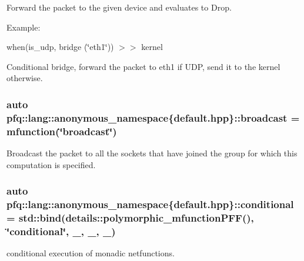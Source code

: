 Forward the packet to the given device and evaluates to {\ttfamily Drop}. 

Example\+:

when(is\+\_\+udp, bridge (\char`\"{}eth1\char`\"{})) $>$$>$ kernel

Conditional bridge, forward the packet to eth1 if U\+D\+P, send it to the kernel otherwise. \hypertarget{namespacepfq_1_1lang_1_1anonymous__namespace_02default_8hpp_03_ac9e0f3ad7fa32146565f4aaab709d19d}{
\subsubsection[{broadcast}]{\setlength{\rightskip}{0pt plus 5cm}auto pfq\+::lang\+::anonymous\+\_\+namespace\{default.\+hpp\}\+::broadcast = {\bf mfunction}(\char`\"{}broadcast\char`\"{})}}\label{namespacepfq_1_1lang_1_1anonymous__namespace_02default_8hpp_03_ac9e0f3ad7fa32146565f4aaab709d19d}


Broadcast the packet to all the sockets that have joined the group for which this computation is specified. 

\hypertarget{namespacepfq_1_1lang_1_1anonymous__namespace_02default_8hpp_03_a99247b15a4e37c0aaec60838716fc8dc}{
\subsubsection[{conditional}]{\setlength{\rightskip}{0pt plus 5cm}auto pfq\+::lang\+::anonymous\+\_\+namespace\{default.\+hpp\}\+::conditional = std\+::bind(details\+::polymorphic\+\_\+mfunction\+P\+F\+F(), \char`\"{}conditional\char`\"{}, \+\_, \+\_, \+\_)}}\label{namespacepfq_1_1lang_1_1anonymous__namespace_02default_8hpp_03_a99247b15a4e37c0aaec60838716fc8dc}


conditional execution of monadic netfunctions. 

